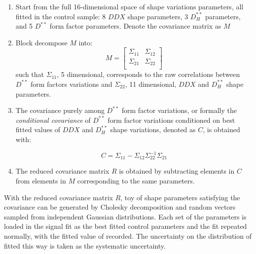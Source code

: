 \begin{enumerate}
    \item Start from the full 16-dimensional space of shape variations
        parameters, all fitted in the control sample:
        8 $DDX$ shape parameters,
        3 $D^{**}_H$ parameters,
        and 5 $D^{**}$ form factor parameters.
        Denote the covariance matrix as $M$

    \item Block decompose $M$ into:
        \begin{equation}
            M =
            \begin{bmatrix}
                \Sigma_{11} &  \Sigma_{12} \\
                \Sigma_{21} &  \Sigma_{22} \\
            \end{bmatrix}
        \end{equation}
        such that $\Sigma_{11}$,
        5 dimensional,
        corresponds to the raw correlations between
        $D^{**}$ form factors variations and
        $\Sigma_{22}$, 11 dimensional,
        $DDX$ and $D^{**}_H$ shape parameters.

    \item The covariance purely among $D^{**}$ form factor variations,
        or formally the \emph{conditional covariance} of $D^{**}$ form factor
        variations conditioned on best fitted values of $DDX$ and $D^{**}_H$
        shape variations, denoted as $C$, is obtained with:

        \begin{equation}
            C = \Sigma_{11} - \Sigma_{12} \Sigma^{-1}_{22} \Sigma_{21}
        \end{equation}

    \item The reduced covariance matrix $R$ is obtained by
        subtracting elements in $C$ from elements in $M$ corresponding to the
        same parameters.
\end{enumerate}

With the reduced covariance matrix $R$, toy of shape parameters satisfying
the covariance can be generated by Cholesky decomposition and random vectors
sampled from independent Gaussian distributions.
Each set of the parameters is loaded in the signal fit as the best
fitted control parameters and the fit repeated normally,
with the fitted value of \RDX recorded.
The uncertainty on the distribution of \RDX fitted this way is taken as the
systematic uncertainty.



